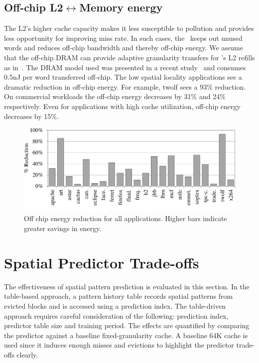 {{\subsection{Off-chip L2$\leftrightarrow$Memory energy}
The L2's higher cache capacity makes it less susceptible to pollution and provides less opportunity for improving miss rate. In such cases, the \AC\ keeps out unused words and reduces off-chip bandwidth and thereby off-chip energy. We assume that the off-chip DRAM can provide adaptive granularity transfers for \AC{}'s L2 refills as in~\cite{Yoon_Jeong_Erez_2011}. The DRAM model used was presented in a recent study~\cite{exascale} and consumes 0.5nJ per word transferred off-chip. The low spatial locality applications see a dramatic reduction in off-chip energy. For example, twolf sees a 93\% reduction. On commercial workloads the off-chip energy decreases by 31\% and 24\% respectively. Even for applications with high cache utilization, off-chip energy decreases by 15\%.

\begin{figure}[h]
  \centering
  \includegraphics[width=\textwidth]{files/Plots/08-Oracle-OffChip-Energy.pdf}
  \caption[Off-Chip Energy Reduction]{Off chip energy reduction for all applications. Higher bars indicate greater savings in energy.}
  \label{fig:offchip_energy}
\end{figure}


\section{Spatial Predictor Trade-offs}
\label{sec:spatial_predictor_tradeoffs}

The effectiveness of spatial pattern prediction is evaluated in this section. In the table-based approach, a pattern history table records spatial patterns from evicted blocks and is accessed using a prediction index. The table-driven approach requires careful consideration of the following: prediction index, predictor table size and training period. The effects are quantified by comparing the predictor against a baseline fixed-granularity cache. A baseline 64K cache is used since it induces enough misses and evictions to highlight the predictor trade-offs clearly.

}}
